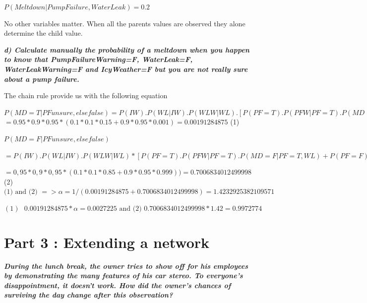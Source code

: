 $P(Meltdown | PumpFailure,WaterLeak ) = 0.2$

No other variables matter.
When all the parents values are observed they alone determine the child value.


\textit{\textbf{d) Calculate manually the probability of a meltdown when you
happen to know that PumpFailureWarning=F, WaterLeak=F, WaterLeakWarning=F and
 IcyWeather=F but you are not really sure about a pump failure.}}

 \vspace{1em}

\begin{center}
The chain rule provide us with the following equation

$P(MD=T|PF unsure,else false)= P(IW).P(WL|IW).P(WLW|WL).[P(PF=T).P(PFW|PF=T).P(MD=T|PF=T,WL)+ P(PF=F).P(PFW|PF=F).P(MD=T|PF=F,WL)]$
$= 0.95*0.9*0.95*(0.1*0.1*0.15+0.9*0.95*0.001) = 0.00191284875$ (1)
\end{center}

\vspace{2em}
\begin{center}
$P(MD=F|PF unsure, else false)$

$=P(IW).P(WL|IW).P(WLW|WL)* [P(PF=T).P(PFW|PF=T).P(MD=F|PF=T,WL) + P(PF=F).P(PFW|PF=F).P(MD=F|PF=F,WL)]$

$= 0,95 * 0,9 * 0,95 * (0.1*0.1*0.85+0.9*0.95*0.999)) =0.7006834012499998$ (2)
\vspace{2em}
$\text{(1) and (2) }=> \alpha = 1 / (0.00191284875 + 0.7006834012499998) = 1.4232925382109571 $

$(1)\text{ } 0.00191284875 * \alpha = 0.0027225\text{ and (2) }0.7006834012499998 * 1.42 = 0.9972774 $

\end{center}




\newpage
\thispagestyle{empty}
\section*{Part 3 : Extending a network}

\textit{\textbf{During the lunch break, the owner tries to show off for his
employees by demonstrating the many features of his car stereo.
To everyone's disappointment, it doesn't work. How did the owner's
chances of surviving the day change after this observation?}}


